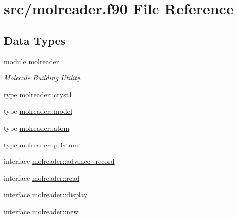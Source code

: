 \hypertarget{molreader_8f90}{\section{src/molreader.f90 File Reference}
\label{molreader_8f90}
}
\subsection*{Data Types}
\begin{DoxyCompactItemize}
\item 
module \hyperlink{classmolreader}{molreader}
\begin{DoxyCompactList}\small\item\em Molecule Building Utility. \end{DoxyCompactList}\item 
type \hyperlink{structmolreader_1_1cryst1}{molreader\+::cryst1}
\item 
type \hyperlink{structmolreader_1_1model}{molreader\+::model}
\item 
type \hyperlink{structmolreader_1_1atom}{molreader\+::atom}
\item 
type \hyperlink{structmolreader_1_1psfatom}{molreader\+::psfatom}
\item 
interface \hyperlink{interfacemolreader_1_1advance__record}{molreader\+::advance\+\_\+record}
\item 
interface \hyperlink{interfacemolreader_1_1read}{molreader\+::read}
\item 
interface \hyperlink{interfacemolreader_1_1display}{molreader\+::display}
\item 
interface \hyperlink{interfacemolreader_1_1new}{molreader\+::new}
\end{DoxyCompactItemize}
